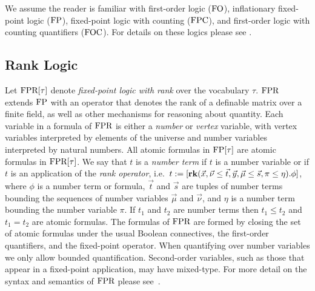 \documentclass[a4paper,UKenglish]{lipics-v2018}
\begin{document}

We assume the reader is familiar with first-order logic ($\text{\upshape FO}$), inflationary
fixed-point logic ($\text{\upshape FP}$), fixed-point logic with counting ($\text{\upshape FPC}$), and
first-order logic with counting quantifiers ($\text{\upshape FOC}$). For details on these
logics please see \cite{grohe2017descriptive, immerman1999descriptive}.

\subsection{Rank Logic}
Let $\text{\upshape FPR}[\tau]$ denote \emph{fixed-point logic with rank} over the vocabulary
$\tau$. $\text{\upshape FPR}$ extends $\text{\upshape FP}$ with an operator that denotes the rank of a
definable matrix over a finite field, as well as other mechanisms for reasoning
about quantity. Each variable in a formula of $\text{\upshape FPR}$ is either a \emph{number}
or \emph{vertex} variable, with vertex variables interpreted by elements of the
universe and number variables interpreted by natural numbers. All atomic
formulas in $\text{\upshape FP}[\tau]$ are atomic formulas in $\text{\upshape FPR}[\tau]$. We say that $t$ is
a \emph{number term} if $t$ is a number variable or if $t$ is an application of
the \emph{rank operator}, i.e.\ $t := [\text{\textbf{rk}} (\vec{x}, \vec {\nu} \leq \vec{t},
\vec{y},\vec{\mu} \leq \vec{s}, \pi \leq \eta). \phi]$, where $\phi$ is a number
term or formula, $\vec{t}$ and $\vec{s}$ are tuples of number terms bounding the
sequences of number variables $\vec{\mu}$ and $\vec{\nu}$, and $\eta$ is a
number term bounding the number variable $\pi$. If $t_1$ and $t_2$ are number
terms then $t_1 \leq t_2$ and $t_1 = t_2$ are atomic formulas. The formulas of
$\text{\upshape FPR}$ are formed by closing the set of atomic formulas under the usual Boolean
connectives, the first-order quantifiers, and the fixed-point operator. When
quantifying over number variables we only allow bounded quantification.
Second-order variables, such as those that appear in a fixed-point application,
may have mixed-type. For more detail on the syntax and semantics of $\text{\upshape FPR}$
please see~\cite{GradelP15a}.
\end{document}
